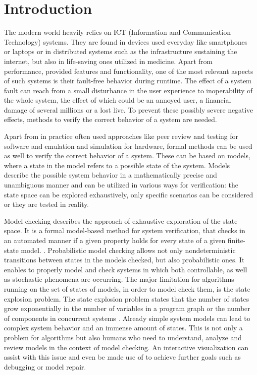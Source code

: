 \documentclass[preview]{standalone}
\begin{document}
\section{Introduction}
	
The modern world heavily relies on ICT (Information and Communication Technology) systems. They are found in devices used everyday like smartphones or laptops or in distributed systems such as the infrastructure sustaining the internet, but also in life-saving ones utilized in medicine. Apart from performance, provided features and functionality, one of the most relevant aspects of such systems is their fault-free behavior during runtime. The effect of a system fault can reach from a small disturbance in the user experience to inoperability of the whole system, the effect of which could be an annoyed user, a financial damage of several millions or a lost live. To prevent these possibly severe negative effects, methods to verify the correct behavior of a system are needed.

Apart from in practice often used approaches like peer review and testing for software and emulation and simulation for hardware, formal methods can be used as well to verify the correct behavior of a system. 
These can be based on models, where a state in the model refers to a possible state of the system. Models describe the possible system behavior in a mathematically precise and unambiguous manner and can be utilized in various ways for verification: the state space can be explored exhaustively, only specific scenarios can be considered or they are tested in reality.

Model checking describes the approach of exhaustive exploration of the state space. It is a formal model-based method for system verification, that checks in an automated manner if a given property holds for every state of a given finite-state model. \cite[chs. 1.1 and 1.2]{Baier2008}. Probabilistic model checking allows not only nondeterministic transitions between states in the models checked, but also probabilistic ones. It enables to properly model and check systems in which both controllable, as well as stochastic phenomena are occurring. The major limitation for algorithms running on the set of states of models, in order to model check them, is the state explosion problem. The state explosion problem states that the number of states grow exponentially in the number of variables in a program graph or the number of components in concurrent systems \cite[ch. 2.3]{Baier2008}. Already simple system models can lead to complex system behavior and an immense amount of states. This is not only a problem for algorithms but also humans who need to understand, analyze and review models in the context of model checking. An interactive visualization can assist with this issue and even be made use of to achieve further goals such as debugging or model repair. 
 
\end{document}
